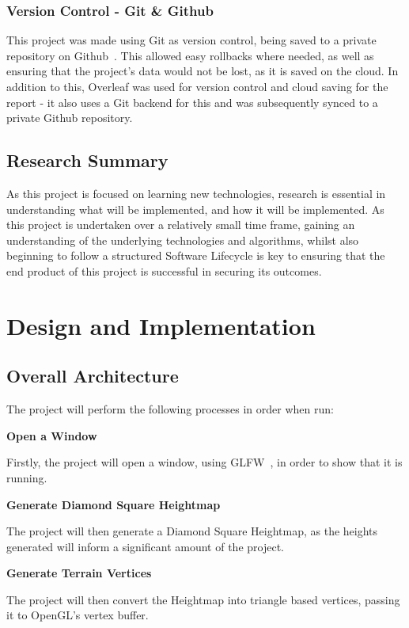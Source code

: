 \documentclass[a4paper,10pt]{report}
\begin{document}
\subsection{Version Control - Git \& Github}
This project was made using Git as version control, being saved to a private repository on Github~\cite{github}. This allowed easy rollbacks where needed, as well as ensuring that the project's data would not be lost, as it is saved on the cloud. In addition to this, Overleaf was used for version control and cloud saving for the report - it also uses a Git backend for this and was subsequently synced to a private Github repository.

\section{Research Summary}
As this project is focused on learning new technologies, research is essential in understanding what will be implemented, and how it will be implemented. As this project is undertaken over a relatively small time frame, gaining an understanding of the underlying technologies and algorithms, whilst also beginning to follow a structured Software Lifecycle is key to ensuring that the end product of this project is successful in securing its outcomes.


\chapter{Design and Implementation}

\section{Overall Architecture}

The project will perform the following processes in order when run: \bigskip

\textbf{Open a Window} \par
Firstly, the project will open a window, using GLFW~\cite{berglund2006glfw}, in order to show that it is running. \medskip

\textbf{Generate Diamond Square Heightmap} \par
The project will then generate a Diamond Square Heightmap, as the heights generated will inform a significant amount of the project. \medskip

\textbf{Generate Terrain Vertices} \par
The project will then convert the Heightmap into triangle based vertices, passing it to OpenGL's vertex buffer. \medskip
\end{document}
